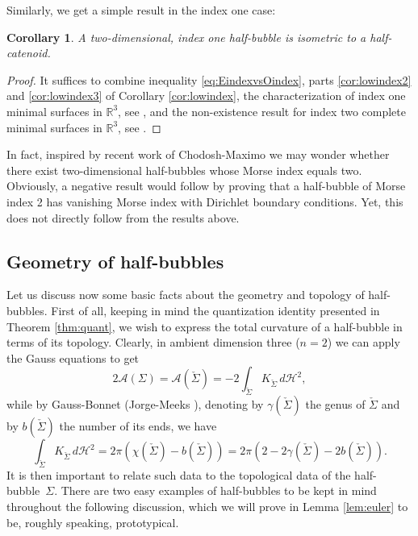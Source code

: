 \documentclass[10pt]{amsart}
\let\mathcal\mathscr
\newcounter{cas}
\newtheorem{cor}[thm]{Corollary}
\theoremstyle{definition}
\newcommand{\R}{\mathbb{R}}
\newcommand{\h}{\mathscr{H}}
\begin{document}
\pagebreak[2]
Similarly, we get a simple result in the index one case:

\begin{cor}\label{cor:indexone}
A two-dimensional, index one half-bubble is isometric to a half-catenoid.
\end{cor}

\begin{proof}
It suffices to combine inequality \eqref{eq:EindexvsOindex}, parts \eqref{cor:lowindex2} and \eqref{cor:lowindex3} of Corollary \ref{cor:lowindex}, the characterization of index one minimal surfaces in $\R^3$, see \cite{LR89}, and the non-existence result for index two complete minimal surfaces in $\R^3$, see \cite{CM14}.
\end{proof}

In fact, inspired by recent work of Chodosh-Maximo \cite{CM14} we may wonder whether there exist two-dimensional half-bubbles whose Morse index equals two.
Obviously, a negative result would follow by proving that a half-bubble of Morse index 2 has vanishing Morse index with Dirichlet boundary conditions. Yet, this does not directly follow from the results above.

\subsection{Geometry of half-bubbles}\label{subs:geomhalf}

Let us discuss now some basic facts about the geometry and topology of half-bubbles. First of all, keeping in mind the quantization identity presented in Theorem \ref{thm:quant}, we wish to express the total curvature of a half-bubble in terms of its topology.
Clearly, in ambient dimension three ($n=2$) we can apply the Gauss equations to get
\begin{equation}\label{eq:half2nd}
2\mathcal{A}(\Sigma)=\mathcal{A}(\check{\Sigma})=-2\int_{\check{\Sigma}} K_{\check{\Sigma}}\,d\h^2,
\end{equation}
while by Gauss-Bonnet (\cf Jorge-Meeks \cite{JM83}), denoting by $\gamma(\check{\Sigma})$ the genus of $\check{\Sigma}$ and by $b(\check{\Sigma})$ the number of its ends, we have
\begin{equation}\label{eq:GBcomplete}
\int_{\check{\Sigma}} K_{\check{\Sigma}}\,d\h^2=2\pi (\chi(\check{\Sigma})-b(\check{\Sigma}))=2\pi(2-2\gamma(\check{\Sigma})-2b(\check{\Sigma})) .
\end{equation}
It is then important to relate such data to the topological data of the half-bubble~$\Sigma$. There are two easy examples of half-bubbles to be kept in mind throughout the following discussion, which we will prove in Lemma \ref{lem:euler} to be, roughly speaking, prototypical.
\end{document}
